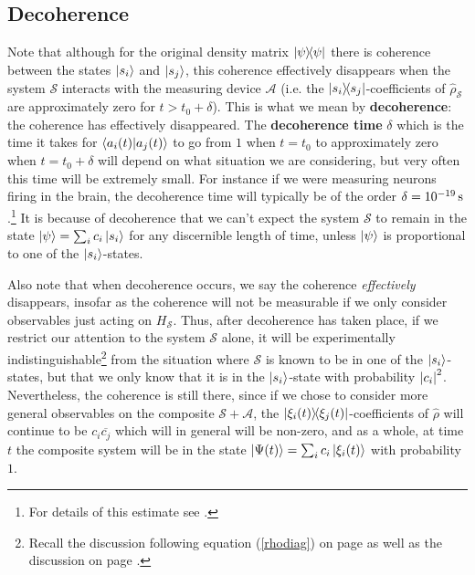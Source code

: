    \subsection{Decoherence}
    Note that although for the original density matrix $\dyad{\psi}$ there is coherence between the states $\ket{s_i}$ and $\ket{s_j}$, this coherence effectively  disappears when the system $\mathcal{S}$ interacts with the measuring device $\mathcal{A}$ (i.e. the $\dyad{s_i}{s_j}$-coefficients of $\hat{\rho}_\mathcal{S}$ are approximately zero for $t> t_0+\delta$). This is what we mean by \textbf{decoherence}: the coherence has effectively disappeared. The \textbf{decoherence time} $\delta$ which is the time it takes for $\ip{a_i(t)}{a_j(t)}$ to go from $1$ when $t=t_0$ to approximately zero when $t=t_0+\delta$ will depend on what situation we are considering, but very often this time will be extremely small. For instance if we were measuring neurons firing in the brain, the decoherence time will typically be of the order $\delta =\du{e-19}{s}$.\footnote{For details of this estimate see \cite[370]{Schlosshauer}.} It is because of decoherence that we can't expect the system $\mathcal{S}$ to remain in the state $\ket{\psi}=\sum_i c_i\ket{s_i}$ for any discernible length of time, unless $\ket{\psi}$ is proportional to one of the $\ket{s_i}$-states.  
    
    Also note that when decoherence occurs, we say the coherence \emph{effectively} disappears, insofar as the coherence will not be measurable if we only consider observables just acting on $H_\mathcal{S}$. Thus, after decoherence has taken place, if we restrict our attention to the system $\mathcal{S}$ alone, it will be experimentally indistinguishable\footnote{Recall the discussion following equation (\ref{rhodiag}) on page \pageref{rhodiag} as well as the discussion on page \pageref{subtle}.} from the situation where $\mathcal{S}$ is known to be in one of the $\ket{s_i}$-states, but that we only know that it is in the $\ket{s_i}$-state with probability $\abs{c_i}^2$. Nevertheless, the coherence is still there, since if we chose to consider more general observables on the composite $\mathcal{S}+\mathcal{A}$, the $\dyad{\xi_i(t)}{\xi_j(t)}$-coefficients of $\hat{\rho}$ will continue to be $c_i\overline{c_j}$ which will in general will be non-zero, and as a whole, at time $t$ the composite system will be in the state $\ket{\Psi(t)}=\sum_i c_i\ket{\xi_i(t)}$ with probability $1$.
    